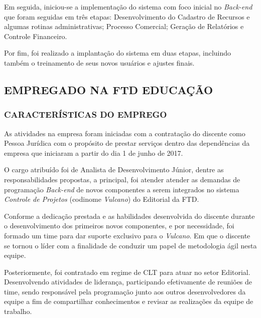 \documentclass[
  12pt,            %
  openany,
  oneside,
  a4paper,         %
  english,      %
  brazil
]{article}
\numberwithin{figure}{section}
\numberwithin{table}{section}
\begin{document}
Em seguida, iniciou-se a implementação do sistema com foco inicial no \textit{Back-end} que foram seguidas em três etapas: Desenvolvimento do Cadastro de Recursos e algumas rotinas administrativas; Processo Comercial; Geração de Relatórios e Controle Financeiro.

Por fim, foi realizado a implantação do sistema em duas etapas, incluindo também o treinamento de seus novos usuários e ajustes finais.



\subsection{EMPREGADO NA FTD EDUCAÇÃO}

\subsubsection{CARACTERÍSTICAS DO EMPREGO}

As atividades na empresa foram iniciadas com a contratação do discente como Pessoa Jurídica com o propósito de prestar serviços dentro das dependências da empresa que iniciaram a partir do dia 1 de junho de 2017.

O cargo atribuído foi de Analista de Desenvolvimento Júnior, dentre as responsabilidades propostas, a principal, foi atender atender as demandas de programação \textit{Back-end} de novos componentes a serem integrados no sistema \textit{Controle de Projetos} (codinome \textit{Vulcano}) do Editorial da FTD.



Conforme a dedicação prestada e as habilidades desenvolvida do discente durante o desenvolvimento dos primeiros novos componentes, e por necessidade, foi formado um time para dar suporte exclusivo para o \textit{Vulcano}. Em que o discente se tornou o líder com a finalidade de conduzir um papel de metodologia ágil nesta equipe.

Posteriormente, foi contratado em regime de CLT para atuar no setor Editorial. Desenvolvendo atividades de liderança, participando efetivamente de reuniões de time, sendo responsável pela programação junto aos outros desenvolvedores da equipe a fim de compartilhar conhecimentos e revisar as realizações da equipe de trabalho.
\end{document}
